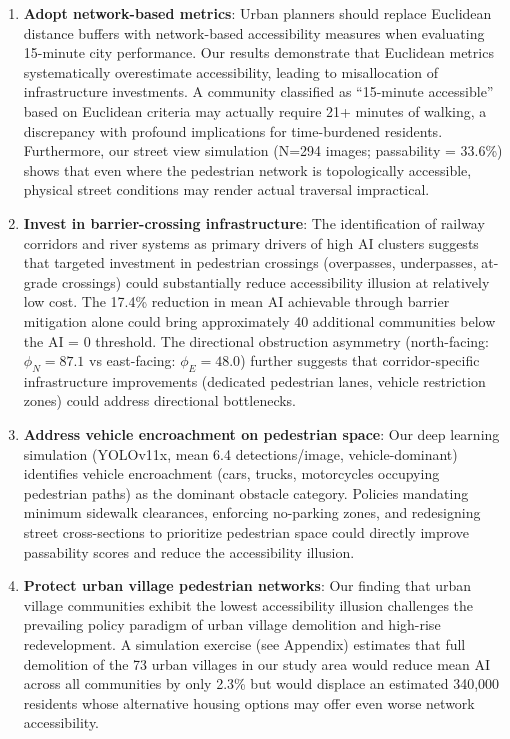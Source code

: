\documentclass[10pt,conference,compsoc]{IEEEtran}
\begin{document}
\begin{table}[htbp]
\begin{center}
\begin{enumerate}
    \item \textbf{Adopt network-based metrics}: Urban planners should replace Euclidean distance buffers with network-based accessibility measures when evaluating 15-minute city performance. Our results demonstrate that Euclidean metrics systematically overestimate accessibility, leading to misallocation of infrastructure investments. A community classified as ``15-minute accessible'' based on Euclidean criteria may actually require 21+ minutes of walking, a discrepancy with profound implications for time-burdened residents. Furthermore, our street view simulation (N=294 images; passability = 33.6\%) shows that even where the pedestrian network is topologically accessible, physical street conditions may render actual traversal impractical.
    \item \textbf{Invest in barrier-crossing infrastructure}: The identification of railway corridors and river systems as primary drivers of high AI clusters suggests that targeted investment in pedestrian crossings (overpasses, underpasses, at-grade crossings) could substantially reduce accessibility illusion at relatively low cost. The 17.4\% reduction in mean AI achievable through barrier mitigation alone could bring approximately 40 additional communities below the AI = 0 threshold. The directional obstruction asymmetry (north-facing: $\phi_N=87.1$ vs east-facing: $\phi_E=48.0$) further suggests that corridor-specific infrastructure improvements (dedicated pedestrian lanes, vehicle restriction zones) could address directional bottlenecks.
    \item \textbf{Address vehicle encroachment on pedestrian space}: Our deep learning simulation (YOLOv11x, mean 6.4 detections/image, vehicle-dominant) identifies vehicle encroachment (cars, trucks, motorcycles occupying pedestrian paths) as the dominant obstacle category. Policies mandating minimum sidewalk clearances, enforcing no-parking zones, and redesigning street cross-sections to prioritize pedestrian space could directly improve passability scores and reduce the accessibility illusion.
    \item \textbf{Protect urban village pedestrian networks}: Our finding that urban village communities exhibit the lowest accessibility illusion challenges the prevailing policy paradigm of urban village demolition and high-rise redevelopment. A simulation exercise (see Appendix) estimates that full demolition of the 73 urban villages in our study area would reduce mean AI across all communities by only 2.3\% but would displace an estimated 340{,}000 residents whose alternative housing options may offer even worse network accessibility.

\end{enumerate}
\end{center}
\end{table}
\end{document}
